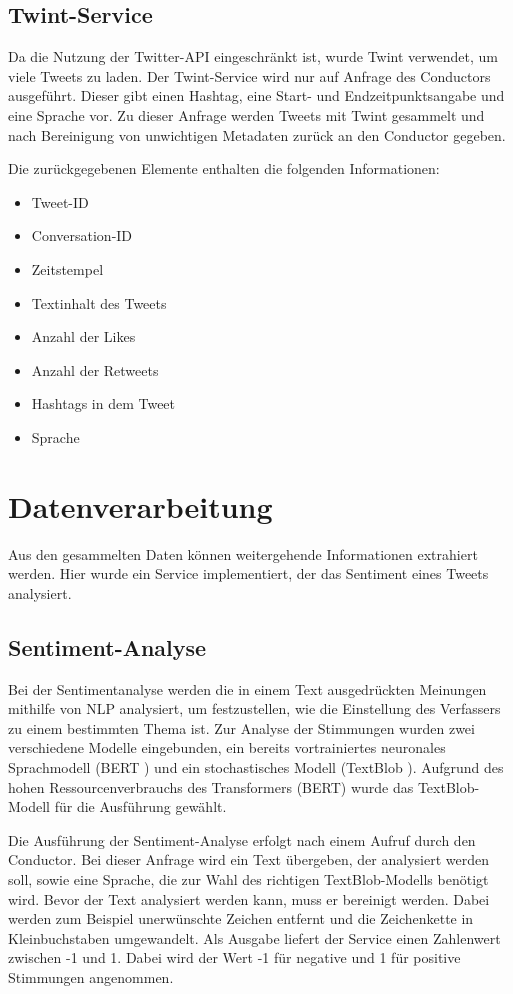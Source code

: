 \documentclass[conference]{IEEEtran}
\begin{document}
\subsection*{Twint-Service}
Da die Nutzung der Twitter-API eingeschränkt ist, wurde Twint verwendet, um viele Tweets zu laden.
Der Twint-Service wird nur auf Anfrage des Conductors ausgeführt.
Dieser gibt einen Hashtag, eine Start- und Endzeitpunktsangabe und eine Sprache vor.
Zu dieser Anfrage werden Tweets mit Twint gesammelt und nach Bereinigung von unwichtigen Metadaten zurück an den Conductor gegeben.

Die zurückgegebenen Elemente enthalten die folgenden Informationen:
\begin{itemize}
    \item Tweet-ID
    \item Conversation-ID
    \item Zeitstempel
    \item Textinhalt des Tweets
    \item Anzahl der Likes
    \item Anzahl der Retweets
    \item Hashtags in dem Tweet
    \item Sprache
\end{itemize}

\section{Datenverarbeitung}
Aus den gesammelten Daten können weitergehende Informationen extrahiert werden.
Hier wurde ein Service implementiert, der das Sentiment eines Tweets analysiert.

\subsection*{Sentiment-Analyse}
Bei der Sentimentanalyse werden die in einem Text ausgedrückten Meinungen mithilfe von NLP analysiert,
um festzustellen, wie die Einstellung des Verfassers zu einem bestimmten Thema ist.
Zur Analyse der Stimmungen wurden zwei verschiedene Modelle eingebunden,
ein bereits vortrainiertes neuronales Sprachmodell (BERT \cite{bert})
und ein stochastisches Modell (TextBlob \cite{textblob}).
Aufgrund des hohen Ressourcenverbrauchs des Transformers (BERT) wurde das TextBlob-Modell für die Ausführung gewählt.

Die Ausführung der Sentiment-Analyse erfolgt nach einem Aufruf durch den Conductor.
Bei dieser Anfrage wird ein Text übergeben, der analysiert werden soll,
sowie eine Sprache, die zur Wahl des richtigen TextBlob-Modells benötigt wird.
Bevor der Text analysiert werden kann, muss er bereinigt werden.
Dabei werden zum Beispiel unerwünschte Zeichen entfernt und die Zeichenkette in Kleinbuchstaben umgewandelt.
Als Ausgabe liefert der Service einen Zahlenwert zwischen -1 und 1.
Dabei wird der Wert -1 für negative und 1 für positive Stimmungen angenommen.
\end{document}
